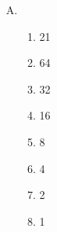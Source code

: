 {{\begin{practices}
\begin{enumerate}[A.]
                {
                    \begin{enumerate}[1.]
                        \item 17
                        \item 52
                        \item 26
                        \item 13
                        \item 40
                        \item 20
                        \item 10
                        \item 5
                        \item 16
                        \item 8
                        \item 4
                        \item 2
                        \item 1
                    \end{enumerate}
                }
                \item
                {
                    \begin{enumerate}[1.]
                        \item 21
                        \item 64
                        \item 32
                        \item 16
                        \item 8
                        \item 4
                        \item 2
                        \item 1
                    \end{enumerate}
                }
            \end{enumerate}
        \end{practices}

}}
